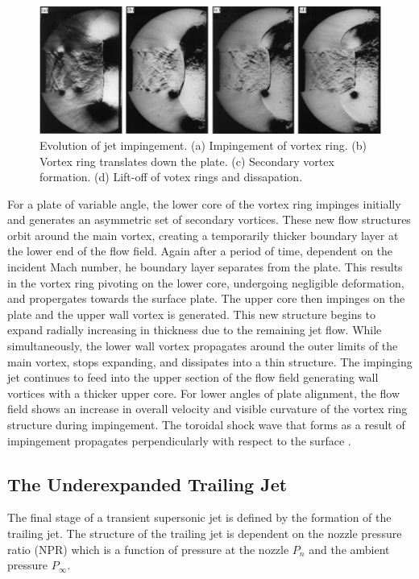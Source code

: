 \begin{figure}[h] 
	\centering
	\includegraphics[width=1\textwidth]{fig4.PNG} 
	\caption{Evolution of jet impingement. (a) Impingement of vortex ring. (b) Vortex ring translates down the plate. (c) Secondary vortex formation. (d) Lift-off of votex rings and dissapation. \citep{szumowski2000starting}}
	\label{fig:4}
\end{figure}
For a plate of variable angle, the lower core of the vortex ring impinges initially and generates an asymmetric set of secondary vortices. These new flow structures orbit around the main vortex, creating a temporarily thicker boundary layer at the lower end of the flow field. Again after a period of time, dependent on the incident Mach number, he boundary layer separates from the plate. This results in the vortex ring pivoting on the lower core, undergoing negligible deformation, and propergates towards the surface plate. The upper core then impinges on the plate and the upper wall vortex is generated. This new structure begins to expand radially increasing in thickness due to the remaining jet flow. While simultaneously, the lower wall vortex propagates around the outer limits of the main vortex, stops expanding, and dissipates into a thin structure. The impinging jet continues to feed into the upper section of the flow field generating wall vortices with a thicker upper core. For lower angles of plate alignment, the flow field shows an increase in overall velocity and visible curvature of the vortex ring structure during impingement. The toroidal shock wave that forms as a result of impingement propagates perpendicularly with respect to the surface \citep{mariani2013head}.  

\subsection{The Underexpanded Trailing Jet}
The final stage of a transient supersonic jet is defined by the formation of the trailing jet. The structure of the trailing jet is dependent on the nozzle pressure ratio (NPR) which is a function of pressure at the nozzle $P_n$ and the ambient pressure $P_{\infty}$.

